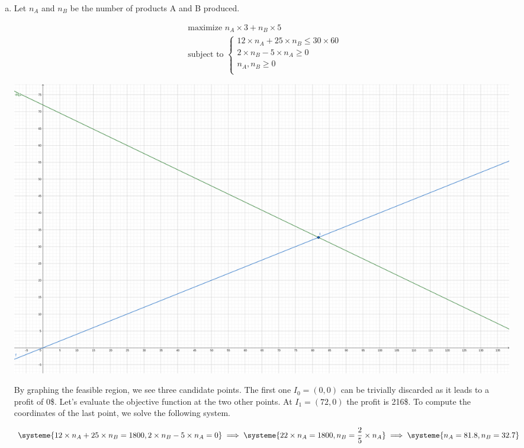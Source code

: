 \documentclass[a4paper, 10pt, twoside]{article}
\begin{document}
\begin{enumerate}[a)]
    \item

          Let $n_{A}$ and $n_{B}$ be the number of products A and B produced.

          \begin{align*}
               & \text{maximize } n_{A} \times 3 + n_{B} \times 5 \\
               & \text{subject to }
              \begin{cases}
                  12 \times n_{A} + 25 \times n_{B} \le 30 \times 60 \\
                  2 \times n_{B} - 5 \times n_{A} \ge 0              \\
                  n_{A}, n_{B} \ge 0                                 \\
              \end{cases}
          \end{align*}

          \begin{center}
              \includegraphics[width = .5 \textwidth]{graph.png}
          \end{center}

          By graphing the feasible region, we see three candidate points. The first one $I_0 = (0, 0)$ can be trivially discarded as it leads to a profit of 0\$. Let's evaluate the objective function at the two other points. At $I_1 = (72, 0)$ the profit is 216\$. To compute the coordinates of the last point, we solve the following system.

          \begin{align*}
              \systeme{
                  12 \times n_{A} + 25 \times n_{B} = 1800,
                  2 \times n_{B} - 5 \times n_{A} = 0
              }
              \implies
              \systeme{
                  22 \times n_{A} = 1800,
                  n_{B} = \frac{2}{5} \times n_{A}
              }
              \implies
              \systeme{
                  n_{A} = 81.8,
                  n_{B} = 32.7
              }
          \end{align*}


\end{enumerate}
\end{document}
